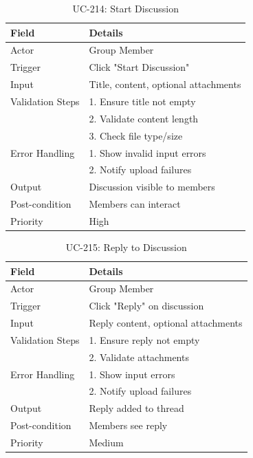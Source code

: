 \begin{table}[H]
\centering
\caption{UC-214: Start Discussion}
\begin{tabular}{|l|p{10cm}|}
\hline
\textbf{Field} & \textbf{Details} \\ \hline
Actor & Group Member \\ \hline
Trigger & Click "Start Discussion" \\ \hline
Input & Title, content, optional attachments \\ \hline
Validation Steps & 1. Ensure title not empty \\ 
                 & 2. Validate content length \\ 
                 & 3. Check file type/size \\ \hline
Error Handling & 1. Show invalid input errors \\ 
               & 2. Notify upload failures \\ \hline
Output & Discussion visible to members \\ \hline
Post-condition & Members can interact \\ \hline
Priority & High \\ \hline
\end{tabular}
\end{table}

\begin{table}[H]
\centering
\caption{UC-215: Reply to Discussion}
\begin{tabular}{|l|p{10cm}|}
\hline
\textbf{Field} & \textbf{Details} \\ \hline
Actor & Group Member \\ \hline
Trigger & Click "Reply" on discussion \\ \hline
Input & Reply content, optional attachments \\ \hline
Validation Steps & 1. Ensure reply not empty \\ 
                 & 2. Validate attachments \\ \hline
Error Handling & 1. Show input errors \\ 
               & 2. Notify upload failures \\ \hline
Output & Reply added to thread \\ \hline
Post-condition & Members see reply \\ \hline
Priority & Medium \\ \hline
\end{tabular}
\end{table}

